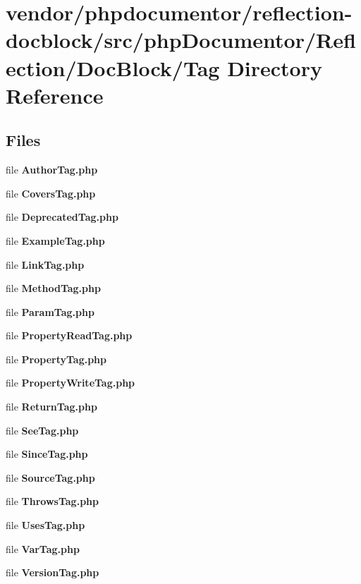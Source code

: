 \section{vendor/phpdocumentor/reflection-\/docblock/src/php\+Documentor/\+Reflection/\+Doc\+Block/\+Tag Directory Reference}
\label{dir_f256bda77e8bce0010868c038177bd06}
\subsection*{Files}
\begin{DoxyCompactItemize}
\item 
file {\bf Author\+Tag.\+php}
\item 
file {\bf Covers\+Tag.\+php}
\item 
file {\bf Deprecated\+Tag.\+php}
\item 
file {\bf Example\+Tag.\+php}
\item 
file {\bf Link\+Tag.\+php}
\item 
file {\bf Method\+Tag.\+php}
\item 
file {\bf Param\+Tag.\+php}
\item 
file {\bf Property\+Read\+Tag.\+php}
\item 
file {\bf Property\+Tag.\+php}
\item 
file {\bf Property\+Write\+Tag.\+php}
\item 
file {\bf Return\+Tag.\+php}
\item 
file {\bf See\+Tag.\+php}
\item 
file {\bf Since\+Tag.\+php}
\item 
file {\bf Source\+Tag.\+php}
\item 
file {\bf Throws\+Tag.\+php}
\item 
file {\bf Uses\+Tag.\+php}
\item 
file {\bf Var\+Tag.\+php}
\item 
file {\bf Version\+Tag.\+php}
\end{DoxyCompactItemize}
